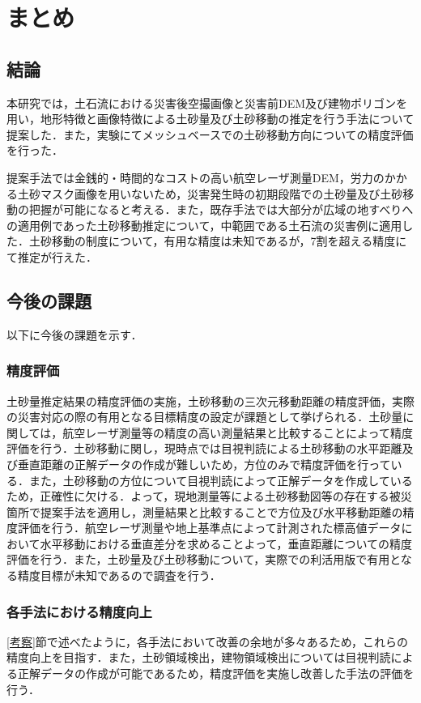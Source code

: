 \chapter{まとめ}
  \section{結論}
    本研究では，土石流における災害後空撮画像と災害前DEM及び建物ポリゴンを用い，地形特徴と画像特徴による土砂量及び土砂移動の推定を行う手法について提案した．また，実験にてメッシュベースでの土砂移動方向についての精度評価を行った．

    提案手法では金銭的・時間的なコストの高い航空レーザ測量DEM，労力のかかる土砂マスク画像を用いないため，災害発生時の初期段階での土砂量及び土砂移動の把握が可能になると考える．また，既存手法では大部分が広域の地すべりへの適用例であった土砂移動推定について，中範囲である土石流の災害例に適用した．土砂移動の制度について，有用な精度は未知であるが，7割を超える精度にて推定が行えた．


  \section{今後の課題}
    以下に今後の課題を示す．


    \subsection*{精度評価}
      土砂量推定結果の精度評価の実施，土砂移動の三次元移動距離の精度評価，実際の災害対応の際の有用となる目標精度の設定が課題として挙げられる．土砂量に関しては，航空レーザ測量等の精度の高い測量結果と比較することによって精度評価を行う．土砂移動に関し，現時点では目視判読による土砂移動の水平距離及び垂直距離の正解データの作成が難しいため，方位のみで精度評価を行っている．また，土砂移動の方位について目視判読によって正解データを作成しているため，正確性に欠ける．よって，現地測量等による土砂移動図等の存在する被災箇所で提案手法を適用し，測量結果と比較することで方位及び水平移動距離の精度評価を行う．航空レーザ測量や地上基準点によって計測された標高値データにおいて水平移動における垂直差分を求めることよって，垂直距離についての精度評価を行う．また，土砂量及び土砂移動について，実際での利活用版で有用となる精度目標が未知であるので調査を行う．


    \subsection*{各手法における精度向上}
      \ref{考察}節で述べたように，各手法において改善の余地が多々あるため，これらの精度向上を目指す．また，土砂領域検出，建物領域検出については目視判読による正解データの作成が可能であるため，精度評価を実施し改善した手法の評価を行う．


